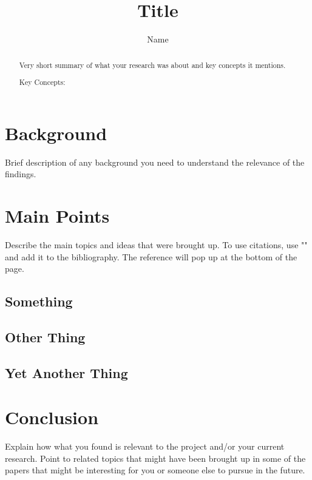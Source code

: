 \documentclass{article}
\title{Title}
\author{Name}
\begin{document}
\maketitle
\begin{abstract}
\color{red}
Very short summary of what your research was about and key concepts it mentions.


Key Concepts: 
\end{abstract}

\section{Background}
\color{red}
Brief description of any background you need to understand the relevance of the findings.
\color{black}



\section{Main Points}
\color{red}
Describe the main topics and ideas that were brought up. To use citations, use "\cite{sample}" and add it to the bibliography. The reference will pop up at the bottom of the page.
\color{black}

\subsection{Something}

\subsection{Other Thing}

\subsection{Yet Another Thing}

\section{Conclusion}
\color{red}
Explain how what you found is relevant to the project and/or your current research.
Point to related topics that might have been brought up in some of the papers that might be interesting for you or someone else to pursue in the future.
\color{black}



\end{document}
